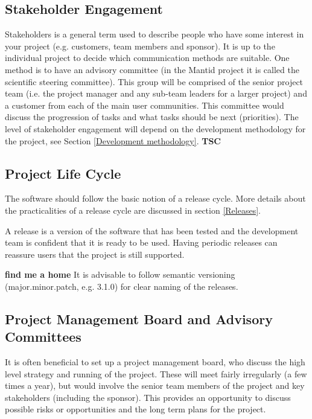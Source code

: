 \documentclass[jnr]{iosart2x}
\newcommand{\todo}[1]{\textbf{#1}}
\begin{document}
\subsection{Stakeholder Engagement}
\label{se}

Stakeholders is a general term used to describe people who have some interest in your project (e.g. customers, team members and sponsor).
It is up to the individual project to decide which communication methods are suitable.
One method is to have an advisory committee (in the Mantid project it is called the scientific steering committee).
This group will be comprised of the senior project team (i.e. the project manager and any sub-team leaders for a larger project) and a customer from each of the main user communities.
This committee would discuss the progression of tasks and what tasks should be next (priorities).
The level of stakeholder engagement will depend on the development methodology for the project, see Section \ref{Development methodology}.
\todo{TSC}

\subsection{Project Life Cycle}
\label{lc}

The software should follow the basic notion of a release cycle. More details about the practicalities of a release cycle are discussed in section \ref{Releases}.

A release is a version of the software that has been tested and the development team is confident that it is ready to be used.
Having periodic releases can reassure users that the project is still supported.

\todo{find me a home}
It is advisable to follow semantic versioning \cite{Semantic_Versioning} (major.minor.patch, e.g. 3.1.0) for clear naming of the releases.

\subsection{Project Management Board and Advisory Committees}
\label{PM big}

It is often beneficial to set up a project management board, who discuss the high level strategy and running of the project.
These will meet fairly irregularly (a few times a year), but would involve the senior team members of the project and key stakeholders (including the sponsor).
This provides an opportunity to discuss possible risks or opportunities and the long term plans for the project.
\end{document}
